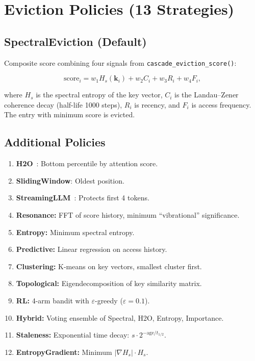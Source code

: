 \documentclass[11pt,a4paper,openright]{book}
\begin{document}
\section{Eviction Policies (13 Strategies)}

\subsection{SpectralEviction (Default)}

Composite score combining four signals from \texttt{cascade\_eviction\_score()}:

\begin{equation}
	\label{eq:spectral_eviction}
	\text{score}_i = w_1 H_s(\mathbf{k}_i) + w_2 C_i + w_3 R_i + w_4 F_i,
\end{equation}

where $H_s$ is the spectral entropy of the key vector, $C_i$ is the Landau--Zener coherence decay (half-life 1000 steps), $R_i$ is recency, and $F_i$ is access frequency. The entry with minimum score is evicted.

\subsection{Additional Policies}

\begin{enumerate}
	\item \textbf{H2O}~\cite{zhang2023h2o}: Bottom percentile by attention score.
	\item \textbf{SlidingWindow}: Oldest position.
	\item \textbf{StreamingLLM}~\cite{xiao2023streamingllm}: Protects first 4 tokens.
	\item \textbf{Resonance:} FFT of score history, minimum ``vibrational'' significance.
	\item \textbf{Entropy:} Minimum spectral entropy.
	\item \textbf{Predictive:} Linear regression on access history.
	\item \textbf{Clustering:} K-means on key vectors, smallest cluster first.
	\item \textbf{Topological:} Eigendecomposition of key similarity matrix.
	\item \textbf{RL:} 4-arm bandit with $\varepsilon$-greedy ($\varepsilon=0.1$).
	\item \textbf{Hybrid:} Voting ensemble of Spectral, H2O, Entropy, Importance.
	\item \textbf{Staleness:} Exponential time decay: $s \cdot 2^{-\text{age}/t_{1/2}}$.
	\item \textbf{EntropyGradient:} Minimum $|\nabla H_s| \cdot H_s$.
\end{enumerate}
\end{document}
